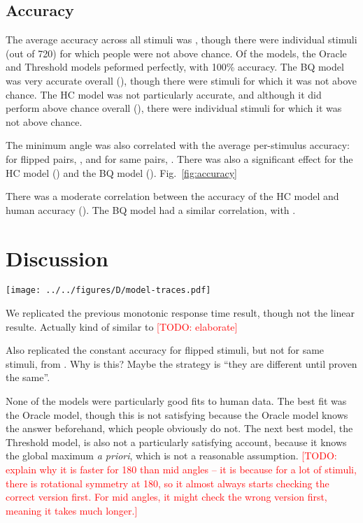\documentclass[10pt,letterpaper]{article}
\newcommand{\TODO}[1]{\textcolor{red}{[TODO: #1]}}
\newcommand{\Oc}[0]{Oracle}
\newcommand{\Th}[0]{Threshold}
\newcommand{\Hc}[0]{HC}
\newcommand{\Bq}[0]{BQ}
\begin{document}
\subsection{Accuracy}

The average accuracy across all stimuli was \ExpAccuracy{}, though
there were \ExpNumChance{} individual stimuli (out of 720) for which
people were not above chance. Of the models, the \Oc{} and \Th{}
models peformed perfectly, with 100\% accuracy. The \Bq{} model was
very accurate overall (\BqAccuracy{}), though there were
\BqNumChance{} stimuli for which it was not above chance. The \Hc{}
model was not particularly accurate, and although it did perform above
chance overall (\HcAccuracy{}), there were \HcNumChance{} individual
stimuli for which it was not above chance.

The minimum angle was also correlated with the average per-stimulus
accuracy: for flipped pairs, \ExpThetaAccuracyCorrFlipped{}, and for
same pairs, \ExpThetaAccuracyCorrSame{}. There was also a significant
effect for the \Hc{} model (\HcThetaAccuracyCorr{}) and the
\Bq{} model
(\BqThetaAccuracyCorr{}). Fig.~\ref{fig:accuracy}

There was a moderate correlation between the accuracy of the \Hc{}
model and human accuracy (\ExpHcAccuracyCorr{}). The \Bq{} model had a
similar correlation, with \ExpBqAccuracyCorr{}.


\section{Discussion}

\begin{figure*}[t]
  \begin{center}
    \texttt{[image: ../../figures/D/model-traces.pdf]}
    \caption{\textbf{Model traces.} \TODO{} \TODO{put pictures of the
        stimuli here}}
    \label{fig:model-traces}
  \end{center}
\end{figure*}

We replicated the previous monotonic response time result, though not
the linear resulte. Actually kind of similar to \cite{Gardony:2013gn}
\TODO{elaborate}

Also replicated the constant accuracy for flipped stimuli, but not for
same stimuli, from \cite{Cooper:1975wp}. Why is this? Maybe the
strategy is ``they are different until proven the same''.

None of the models were particularly good fits to human data. The best
fit was the \Oc{} model, though this is not satisfying because the
\Oc{} model knows the answer beforehand, which people obviously do
not. The next best model, the \Th{} model, is also not a
particularly satisfying account, because it knows the global maximum
\textit{a priori}, which is not a reasonable assumption. \TODO{explain
  why it is faster for 180 than mid angles -- it is because for a lot
  of stimuli, there is rotational symmetry at 180, so it almost always
  starts checking the correct version first. For mid angles, it might
  check the wrong version first, meaning it takes much longer.}
\end{document}
